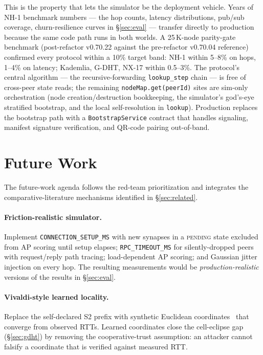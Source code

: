\documentclass[conference]{IEEEtran}
\newcommand{\nhone}{NH-1\xspace}
\newcommand{\GDHT}{G-DHT\xspace}
\begin{document}
This is the property that lets the simulator be the deployment
vehicle. Years of \nhone benchmark numbers --- the hop counts,
latency distributions, pub/sub coverage, churn-resilience curves
in \S\ref{sec:eval} --- transfer directly to production because
the same code path runs in both worlds. A 25\,K-node parity-gate
benchmark (post-refactor v0.70.22 against the pre-refactor
v0.70.04 reference) confirmed every protocol within a 10\% target
band: \nhone within 5--8\% on hops, 1--4\% on latency; Kademlia,
\GDHT, NX-17 within 0.5--3\%. The protocol's central algorithm
--- the recursive-forwarding \texttt{lookup\_step} chain --- is
free of cross-peer state reads; the remaining
\texttt{nodeMap.get(peerId)} sites are sim-only orchestration
(node creation/destruction bookkeeping, the simulator's god's-eye
stratified bootstrap, and the local self-resolution in
\texttt{lookup}). Production replaces the bootstrap path with a
\texttt{BootstrapService} contract that handles signaling,
manifest signature verification, and QR-code pairing
out-of-band.

\section{Future Work}
\label{sec:future}

The future-work agenda follows the red-team prioritization
\cite{nh1redteam2026} and integrates the comparative-literature
mechanisms identified in \S\ref{sec:related}.

\paragraph{Friction-realistic simulator.} Implement
\texttt{CONNECTION\_SETUP\_MS} with new synapses in a
\textsc{pending} state excluded from AP scoring until setup elapses;
\texttt{RPC\_TIMEOUT\_MS} for silently-dropped peers with
request/reply path tracing; load-dependent AP scoring; and Gaussian
jitter injection on every hop. The resulting measurements would be
\emph{production-realistic} versions of the results in \S\ref{sec:eval}.

\paragraph{Vivaldi-style learned locality.} Replace the self-declared
S2 prefix with synthetic Euclidean coordinates~\cite{dabek2004vivaldi}
that converge from observed RTTs. Learned coordinates close the
cell-eclipse gap (\S\ref{sec:gdht}) by removing the cooperative-trust
assumption: an attacker cannot falsify a coordinate that is verified
against measured RTT.
\end{document}
